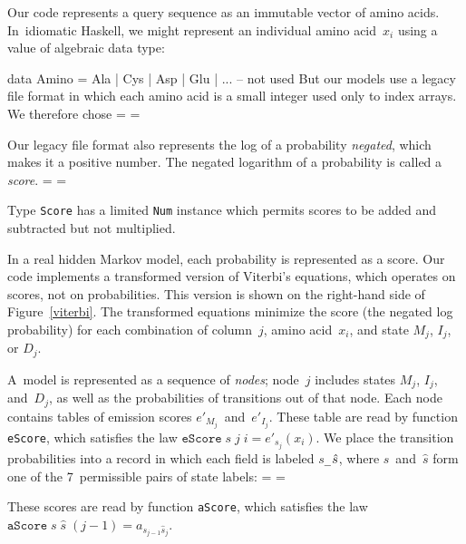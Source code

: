 \documentclass[preprint,nonatbib,blockstyle,times]{sigplanconf}
\newcommand\txprobj[3][]{a#1_{{#2}_{j-1}{#3}_j}}
\newcommand\figref[1]{Figure~\ref{#1}}
\newif\ifverbatimsmall
\newenvironment{smallverbatim}{\par\small\verbatimsmalltrue\verbatim}{\endverbatim}
\newcommand\smallverbatiminput[1]{%
  \verbatimsmalltrue
  \presvtopsep=\topsep
  \topsep=0.78\topsep
  \verbatimsmallfalse
  \topsep=\presvtopsep
}
\begin{document}
Our code represents a query sequence as an immutable vector of amino
acids.
In~idiomatic Haskell, 
we might represent an individual amino acid~$x_i$
using a value of algebraic data type:
\begin{smallverbatim}
data Amino = Ala | Cys | Asp | Glu | ...   -- not used
\end{smallverbatim}
But our models use a
legacy file format in which each amino acid is a small integer
used only to index arrays.
We therefore chose 
\smallverbatiminput{aa}


Our legacy file format also represents
the log of a probability \emph{negated}, which makes it a positive number.
The negated logarithm of a probability is called a \emph{score}.
\smallverbatiminput{score}
Type \texttt{Score} has a limited \texttt{Num} instance which permits
scores to be added and subtracted but not multiplied.

In a real hidden Markov model, each probability is represented as a score.
Our code implements a transformed version of Viterbi's equations, 
which operates on scores, not on probabilities.
This version is
shown on the right-hand side of \figref{viterbi}.
The transformed equations minimize the
score (the negated log probability) for each combination of
column~$j$, amino 
acid~$x_i$, and state $M_j$, $I_j$, or $D_j$.

A~model is represented as a sequence of \emph{nodes};
node~$j$ includes states $M_j$, $I_j$, and~$D_j$,
as well as the probabilities of transitions out of that node.
Each node contains tables of emission scores
$e'_{M_j}$~and~$e'_{I_j}$.
These table are read by function
\texttt{eScore}, which satisfies
the law %
\mbox{$\mathtt{eScore}\;s\;j\;i = e'_{s_j}(x_i)$}.
%
We place the transition probabilities 
into a record in which each field is labeled
\texttt{$s$\_$\mskip 1mu\hat s$},
where $s$~and~$\hat s$ form one of the 7~permissible pairs of state
labels: 
\smallverbatiminput{tprob-tprobs}
These scores are read by
function \texttt{aScore}, 
which satisfies
the law %
\mbox{$\mathtt{aScore}\;s\;\hat s\;(j-1) = \txprobj s {\hat s}$}.
\end{document}
